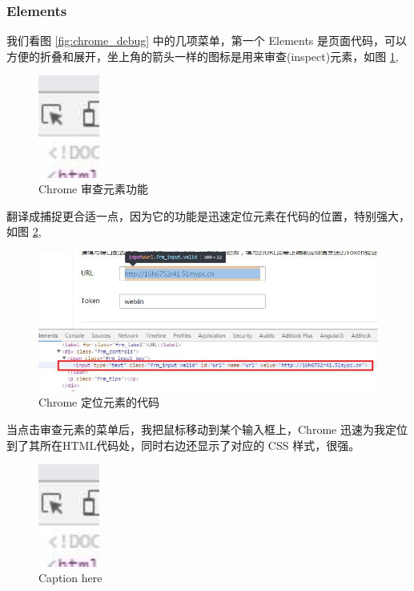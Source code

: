             \subsubsection{Elements}
              \label{subsubsec:elements}
                我们看图 \ref{fig:chrome_debug} 中的几项菜单，第一个 Elements 是页面代码，可以方便的折叠和展开，坐上角的箭头一样的图标是用来审查(inspect)元素，如图 \ref{fig:cr_inspect},
                \begin{figure}[H]
                  \centering

                  \includegraphics[width=2cm]{./img/cr_inspect.jpg}
                  \caption{Chrome 审查元素功能}
                  \label{fig:cr_inspect}
                \end{figure}
                翻译成捕捉更合适一点，因为它的功能是迅速定位元素在代码的位置，特别强大，如图 \ref{fig:cr_inspect1},
                \begin{figure}[H]
                  \centering
                  \includegraphics[width=12cm]{./img/cr_inspect1.jpg}
                  \caption{Chrome 定位元素的代码}
                  \label{fig:cr_inspect1}
                \end{figure}
                当点击审查元素的菜单后，我把鼠标移动到某个输入框上，Chrome 迅速为我定位到了其所在HTML代码处，同时右边还显示了对应的 CSS 样式，很强。
                \begin{figure}[H]
                  \centering
                  \includegraphics[width=2cm]{./img/cr_inspect.jpg}
                  \caption{Caption here}
                  \label{fig:figure1}
                \end{figure}


